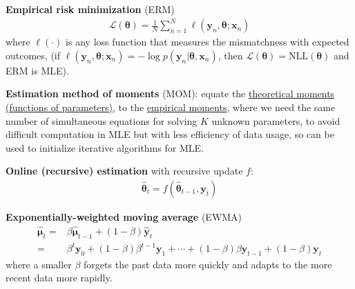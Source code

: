 \textbf{Empirical risk minimization} (ERM) 
\begin{gather}
    \mathcal{L}(\bm{\theta})=\frac{1}{N}\sum_{n=1}^N\ell(\bm{y}_n,\bm{\theta};\bm{x}_n)
\end{gather}
where $\ell(\cdot)$ is any loss function that measures the mismatchness with expected outcomes, 
(if $\ell(\bm{y}_n,\bm{\theta};\bm{x}_n)=-\log{p(\bm{y}_n|\bm{\theta},\bm{x}_n)}$,
then $\mathcal{L}(\bm{\theta})=\text{NLL}(\bm{\theta})$ and ERM is MLE).

    




\textbf{Estimation method of moments} (MOM): 
equate the \uline{theoretical moments (functions of parameters)},
to the \uline{empirical moments},
where we need the same number of simultaneous equations for solving $K$ unknown parameters,
to avoid difficult computation in MLE 
but with less efficiency of data usage, so can be used to initialize iterative algorithms for MLE.

\textbf{Online (recursive) estimation} with recursive update $f$:
\begin{gather}
    \hat{\bm{\theta}}_t=f(\hat{\bm{\theta}}_{t-1},\bm{y}_t)
\end{gather}

\begin{example}
    \textbf{Exponentially-weighted moving average} (EWMA)
    \begin{align}
        \hat{\bm{\mu}}_t
        =& \beta\hat{\bm{\mu}}_{t-1}+(1-\beta)\hat{\bm{y}}_t\\
        =& \beta^t\bm{y}_0 + (1-\beta)\beta^{t-1}\bm{y}_1 + \cdots + (1-\beta)\beta\bm{y}_{t-1} + (1-\beta)\bm{y}_t
    \end{align}
    where a smaller $\beta$ forgets the past data more quickly and 
    adapts to the more recent data more rapidly.
\end{example}

